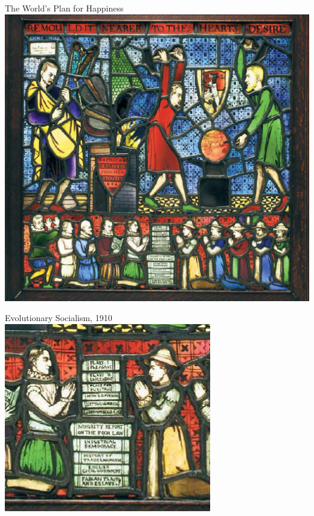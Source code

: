 \begin{frame}{The World's Plan for Happiness}
    \centering
    \includegraphics[height=.9\textheight]{img/remold-it.jpg} \\
\end{frame}

\begin{frame}{Evolutionary Socialism, 1910}
    \centering
    \includegraphics[height=.9\textheight]{img/remold-it-small.png} \\
\end{frame}

